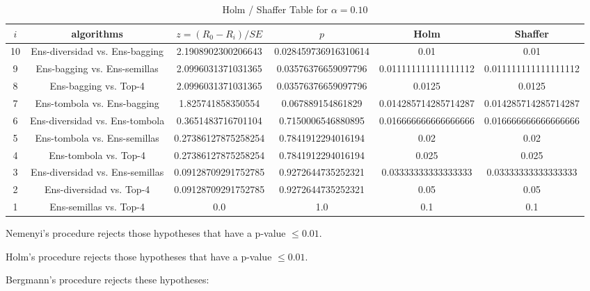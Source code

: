 \documentclass[a4paper,10pt]{article}
\begin{document}
\begin{landscape}
\begin{table}[!htp]
\centering\tiny
\caption{Holm / Shaffer Table for $\alpha=0.10$}
\begin{tabular}{cccccc}
$i$&algorithms&$z=(R_0 - R_i)/SE$&$p$&Holm&Shaffer\\
\hline
10&Ens-diversidad vs. Ens-bagging&2.1908902300206643&0.028459736916310614&0.01&0.01\\
9&Ens-bagging vs. Ens-semillas&2.0996031371031365&0.03576376659097796&0.011111111111111112&0.011111111111111112\\
8&Ens-bagging vs. Top-4&2.0996031371031365&0.03576376659097796&0.0125&0.0125\\
7&Ens-tombola vs. Ens-bagging&1.825741858350554&0.067889154861829&0.014285714285714287&0.014285714285714287\\
6&Ens-diversidad vs. Ens-tombola&0.3651483716701104&0.7150006546880895&0.016666666666666666&0.016666666666666666\\
5&Ens-tombola vs. Ens-semillas&0.27386127875258254&0.7841912294016194&0.02&0.02\\
4&Ens-tombola vs. Top-4&0.27386127875258254&0.7841912294016194&0.025&0.025\\
3&Ens-diversidad vs. Ens-semillas&0.09128709291752785&0.9272644735252321&0.03333333333333333&0.03333333333333333\\
2&Ens-diversidad vs. Top-4&0.09128709291752785&0.9272644735252321&0.05&0.05\\
1&Ens-semillas vs. Top-4&0.0&1.0&0.1&0.1\\
\hline
\end{tabular}
\end{table}
Nemenyi's procedure rejects those hypotheses that have a p-value $\le0.01$.


Holm's procedure rejects those hypotheses that have a p-value $\le0.01$.


Bergmann's procedure rejects these hypotheses:


\begin{itemize}


\end{itemize}



\end{landscape}
\end{document}
